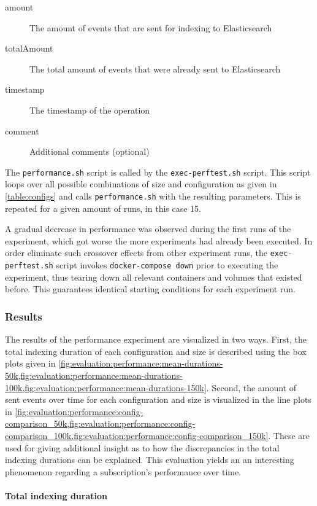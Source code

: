 \begin{description}
\item[amount] The amount of events that are sent for indexing to Elasticsearch
\item[totalAmount] The total amount of events that were already sent to Elasticsearch
\item[timestamp] The timestamp of the operation
\item[comment] Additional comments (optional)
\end{description}

The \texttt{performance.sh} script is called by the \texttt{exec-perftest.sh} script.
This script loops over all possible combinations of size and configuration as given in \cref{table:configs} and calls \texttt{performance.sh} with the resulting parameters.
This is repeated for a given amount of runs, in this case 15.

A gradual decrease in performance was observed during the first runs of the experiment, which got worse the more experiments had already been executed.
In order eliminate such crossover effects from other experiment runs, the \texttt{exec-perftest.sh} script invokes \texttt{docker-compose down} prior to executing the experiment, thus tearing down all relevant containers and volumes that existed before.
This guarantees identical starting conditions for each experiment run.

\subsubsection{Results}

The results of the performance experiment are visualized in two ways.
First, the total indexing duration of each configuration and size is described using the box plots given in \cref{fig:evaluation:performance:mean-durations-50k,fig:evaluation:performance:mean-durations-100k,fig:evaluation:performance:mean-durations-150k}.
Second, the amount of sent events over time for each configuration and size is visualized in the line plots in \cref{fig:evaluation:performance:config-comparison_50k,fig:evaluation:performance:config-comparison_100k,fig:evaluation:performance:config-comparison_150k}.
These are used for giving additional insight as to how the discrepancies in the total indexing durations can be explained.
This evaluation yields an an interesting phenomenon regarding a subscription's performance over time.

\paragraph{Total indexing duration}

